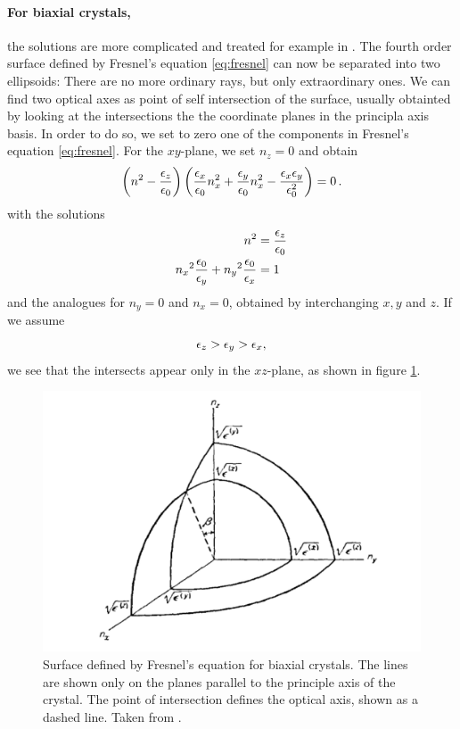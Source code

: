 \paragraph{For biaxial crystals,}
 the solutions are more complicated and 
treated for example in \cite{landau1984electrodynamics}. 
The fourth order surface defined by Fresnel's equation 
\eqref{eq:fresnel} can now be separated into 
two ellipsoids: There are no more ordinary rays, but only 
extraordinary ones. We can find two 
optical axes as point of self intersection of the 
surface, usually obtainted by looking at the intersections 
the the coordinate planes in the principla axis basis.
In order to do so, we set to zero one of the components 
in Fresnel's equation \eqref{eq:fresnel}. For the 
$xy$-plane, we set $n_z = 0$ and obtain
\begin{equation}
    \left(n^2 - \frac{\epsilon_z}{\epsilon_0}\right) 
    \left(\frac{\epsilon_x}{\epsilon_0} n_x^2 + 
        \frac{\epsilon_y}{\epsilon_0} n_x^2  -
        \frac{\epsilon_x \epsilon_y}{\epsilon_0^2} 
    \right) = 0 \, .
\end{equation}
with the solutions
\begin{align}
    n^2 &= \frac{\epsilon_z}{\epsilon_0} 
    \label{eq:sphere} \\
    {n_x}^2 \frac{\epsilon_0}{\epsilon_y} + {n_y}^2 \frac{\epsilon_0}{\epsilon_x} &= 1
    \label{eq:ellipsoid}
\end{align}
and the analogues for $n_y = 0$ and $n_x = 0$, obtained by 
interchanging $x, y$ and $z$. If we assume 
\begin{equation}
    \epsilon_z > \epsilon_y > \epsilon_x, 
\end{equation}
we see that the intersects appear only in the $xz$-plane, as shown in 
figure \ref{fig:biaxial_ellipsoid}.
\begin{figure}
\includegraphics[width=\pltw]{figures/biaxial_ellipsoid.pdf}
\caption{Surface defined by Fresnel's equation for biaxial crystals.
    The lines are shown only on the planes parallel to the principle 
    axis of the crystal. The point of intersection defines the optical axis, 
    shown as a dashed line. 
    Taken from \cite{landau1984electrodynamics}. }
\label{fig:biaxial_ellipsoid}
\end{figure}
